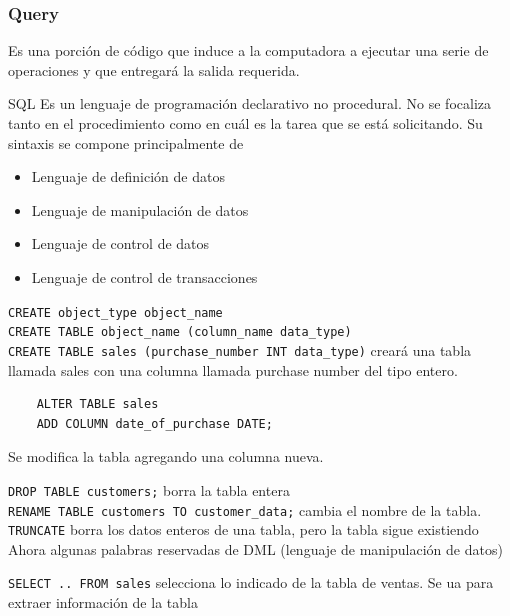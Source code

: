     \subsubsection{Query}

    Es una porción de código que induce a la computadora a ejecutar una serie de operaciones y que entregará la salida requerida.


    SQL Es un lenguaje de programación declarativo no procedural. No se focaliza tanto en el procedimiento como en cuál es la tarea que se está solicitando. Su sintaxis se compone principalmente de 

    \begin{itemize}
        \item Lenguaje de definición de datos
        \item Lenguaje de manipulación de datos
        \item Lenguaje de control de datos
        \item Lenguaje de control de transacciones
    \end{itemize}

    \texttt{CREATE object\_type object\_name} \\

    \texttt{CREATE TABLE object\_name (column\_name data\_type)} \\


    \texttt{CREATE TABLE sales (purchase\_number INT data\_type)} creará una tabla llamada sales con una columna llamada purchase number del tipo entero.

    \begin{verbatim}
    ALTER TABLE sales
    ADD COLUMN date_of_purchase DATE;
    \end{verbatim}

    Se modifica la tabla agregando una columna nueva.

    \texttt{DROP TABLE customers;} borra la tabla entera \\


    \texttt{RENAME TABLE customers TO customer\_data;} cambia el nombre de la tabla. \\

    \texttt{TRUNCATE} borra los datos enteros de una tabla, pero la tabla sigue existiendo \\

    Ahora algunas palabras reservadas de DML (lenguaje de manipulación de datos)

    \texttt{SELECT .. FROM sales} selecciona lo indicado de la tabla de ventas. Se ua para extraer información de la tabla


